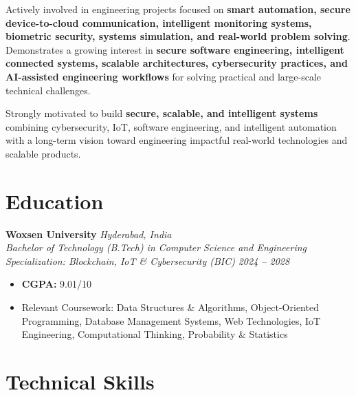 \documentclass[a4paper,11pt]{article}
\newcommand{\resumeSubheading}[4]{
\textbf{#1} \hfill \textit{#2} \\
\textit{#3} \hfill \textit{#4}
\vspace{4pt}
}
\begin{document}
Actively involved in engineering projects focused on \textbf{smart automation, secure device-to-cloud communication, intelligent monitoring systems, biometric security, systems simulation, and real-world problem solving}. Demonstrates a growing interest in \textbf{secure software engineering, intelligent connected systems, scalable architectures, cybersecurity practices, and AI-assisted engineering workflows} for solving practical and large-scale technical challenges.

Strongly motivated to build \textbf{secure, scalable, and intelligent systems} combining cybersecurity, IoT, software engineering, and intelligent automation with a long-term vision toward engineering impactful real-world technologies and scalable products.



\section{Education}

\resumeSubheading
{Woxsen University}{Hyderabad, India}
{Bachelor of Technology (B.Tech) in Computer Science and Engineering\\
Specialization: Blockchain, IoT \& Cybersecurity (BIC)}
{2024 -- 2028}

\begin{itemize}
    \item \textbf{CGPA:} 9.01/10
    \item Relevant Coursework: Data Structures \& Algorithms, Object-Oriented Programming, Database Management Systems, Web Technologies, IoT Engineering, Computational Thinking, Probability \& Statistics
\end{itemize}



\section{Technical Skills}
\end{document}
